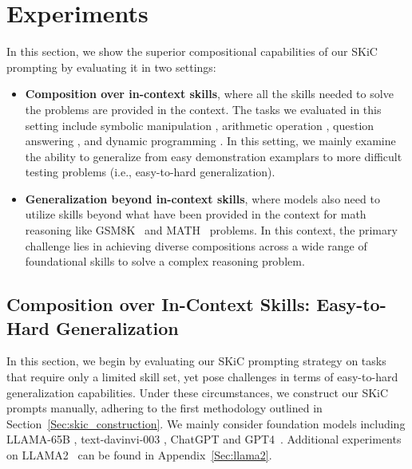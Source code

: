 



\section{Experiments}
\label{sec: experiments}
In this section, we show the superior compositional capabilities of our SKiC prompting by evaluating it in two settings:


\begin{itemize}[leftmargin=*]
  \item \textbf{Composition over in-context skills}, where all the skills needed to solve the problems are provided in the context. The tasks we evaluated in this setting  include symbolic manipulation \citep{wei2022chain,zhou2022least,khot2022decomposed}, arithmetic operation \citep{dziri2023faith}, question answering \citep{khot2022decomposed}, and dynamic programming \citep{dziri2023faith}. In this setting, we mainly examine the ability to generalize from easy demonstration examplars to more difficult testing problems (i.e., easy-to-hard generalization).
  
  \item \textbf{Generalization beyond in-context skills}, where models also need to utilize skills beyond what have been provided in the context for math reasoning like GSM8K~\citep{wei2022chain,zhou2022least} and MATH~\citep{hendrycks2021measuring} problems. In this context, the primary challenge lies in achieving diverse compositions across a wide range of foundational skills to solve a complex reasoning problem.
\end{itemize}


\subsection{Composition over In-Context Skills: Easy-to-Hard Generalization}

In this section, we begin by evaluating our SKiC prompting strategy on tasks that require only a limited skill set, yet pose challenges in terms of easy-to-hard generalization capabilities. Under these circumstances, we construct our SKiC prompts manually, adhering to the first methodology outlined in Section~\ref{Sec:skic_construction}. We mainly consider foundation models including LLAMA-65B \citep{touvron2023llama1}, text-davinvi-003 \citep{brown2020language}, ChatGPT and GPT4~\citep{openai2023gpt4}. Additional experiments on LLAMA2~\citep{touvron2023llama} can be found in Appendix~\ref{Sec:llama2}.

